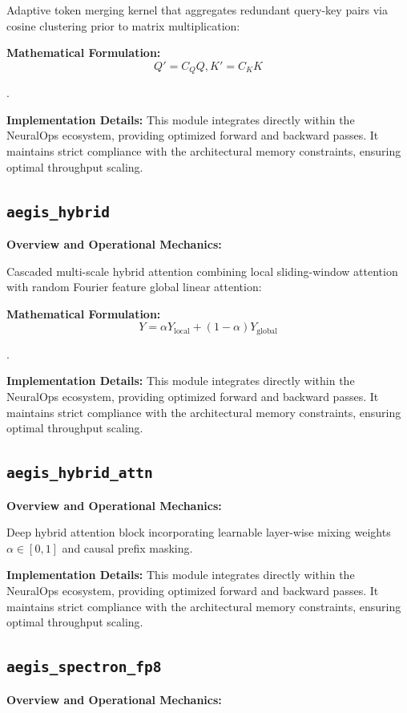 \documentclass[10pt,twocolumn,letterpaper]{article}
\begin{document}
Adaptive token merging kernel that aggregates redundant query-key pairs via cosine clustering prior to matrix multiplication:

\textbf{Mathematical Formulation:}
\begin{equation}
Q' = C_Q Q, K' = C_K K
\end{equation}

.

\textbf{Implementation Details:}
This module integrates directly within the NeuralOps ecosystem, providing optimized forward and backward passes. It maintains strict compliance with the architectural memory constraints, ensuring optimal throughput scaling.

\subsection{\texttt{aegis\_hybrid}}
\textbf{Overview and Operational Mechanics:}

Cascaded multi-scale hybrid attention combining local sliding-window attention with random Fourier feature global linear attention:

\textbf{Mathematical Formulation:}
\begin{equation}
Y = \alpha Y_{\text{local}} + (1-\alpha) Y_{\text{global}}
\end{equation}

.

\textbf{Implementation Details:}
This module integrates directly within the NeuralOps ecosystem, providing optimized forward and backward passes. It maintains strict compliance with the architectural memory constraints, ensuring optimal throughput scaling.

\subsection{\texttt{aegis\_hybrid\_attn}}
\textbf{Overview and Operational Mechanics:}

Deep hybrid attention block incorporating learnable layer-wise mixing weights $\alpha \in [0, 1]$ and causal prefix masking.

\textbf{Implementation Details:}
This module integrates directly within the NeuralOps ecosystem, providing optimized forward and backward passes. It maintains strict compliance with the architectural memory constraints, ensuring optimal throughput scaling.

\subsection{\texttt{aegis\_spectron\_fp8}}
\textbf{Overview and Operational Mechanics:}
\end{document}

